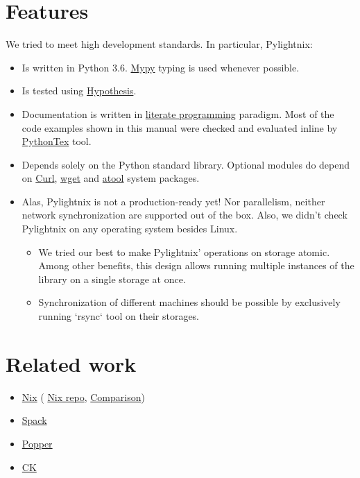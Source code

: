 \documentclass{article}
\begin{document}
\section{Features}

We tried to meet high development standards. In particular, Pylightnix:
\begin{itemize}
  \item Is written in Python 3.6. \href{http://mypy-lang.org/}{Mypy} typing is
    used whenever possible.
  \item Is tested using \href{https://pypi.org/project/hypothesis/}{Hypothesis}.
  \item Documentation is written in
    \href{https://en.wikipedia.org/wiki/Literate_programming}{literate
    programming} paradigm. Most of the code examples shown in this manual were
    checked and evaluated inline by
    \href{https://github.com/gpoore/pythontex}{PythonTex} tool.
  \item Depends solely on the Python standard library. Optional modules
    do depend on \href{https://curl.se/}{Curl},
    \href{https://www.gnu.org/software/wget/}{wget} and
    \href{https://www.nongnu.org/atool/}{atool} system packages.
  \item Alas, Pylightnix is not a production-ready yet! Nor parallelism, neither
    network synchronization are supported out of the box. Also, we didn't check
    Pylightnix on any operating system besides Linux.
    \begin{itemize}
      \item We tried our best to make Pylightnix' operations on storage atomic.
        Among other benefits, this design allows running multiple instances of
        the library on a single storage at once.
      \item Synchronization of different machines should be possible by
        exclusively running `rsync` tool on their storages.
    \end{itemize}
\end{itemize}

\section{Related work}

\begin{itemize}
  \item \href{https://nixos.org}{Nix} (
    \href{https://github.com/nixos/nix}{Nix repo},
    \href{./Comparison.md#Pylightnix-vs-Nix}{Comparison})
  \item \href{https://spack.io}{Spack}
  \item \href{https://falsifiable.us}{Popper}
  \item \href{https://cknowledge.org}{CK}
\end{itemize}
\end{document}
